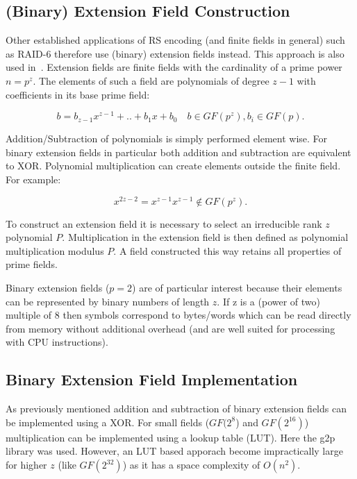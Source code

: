 \documentclass[
]{article}
\begin{document}
\newpage
\subsection{(Binary) Extension Field
Construction}\label{binary-extension-field-construction}

Other established applications of RS encoding (and finite fields in
general) such as RAID-6 therefore use (binary) extension fields instead. This approach is also used in~\cite{Ferrara2022}.
Extension fields are finite fields with the cardinality of a prime power
\(n = p^z\). The elements of such a field are polynomials of degree
\(z - 1\) with coefficients in its base prime field:

\begin{equation}
b = b_{z - 1} x^{z - 1} + .. + b_1 x + b_0 \quad b \in GF(p^z), b_i \in GF(p).
\end{equation}

Addition/Subtraction of polynomials is simply performed element wise.
For binary extension fields in particular both addition and subtraction
are equivalent to XOR. Polynomial multiplication can create
elements outside the finite field. For example:

\begin{equation}
x^{2z - 2} = x^{z - 1} x^{z - 1} \notin GF(p^z).
\end{equation}

To construct an extension field it is necessary to select an irreducible
rank \(z\) polynomial \(P\). Multiplication in
the extension field is then defined as polynomial multiplication modulus
\(P\). A field constructed this way retains all properties of prime
fields.

Binary extension fields (\(p = 2\)) are of particular interest because
their elements can be represented by binary numbers of length \(z\). If
z is a (power of two) multiple of 8 then symbols correspond to
bytes/words which can be read directly from memory without additional
overhead (and are well suited for processing with CPU instructions).

\subsection{Binary Extension Field
Implementation}\label{binary-extension-field-implementation}

As previously mentioned addition and subtraction of binary extension
fields can be implemented using a XOR. For small fields ($GF(2^{8}$) and
$GF(2^{16})$)  multiplication can be implemented using a lookup table (LUT). Here the
g2p~\cite{Wanzenbock} library was used. However, an LUT based apporach become impractically
large for higher \(z\) (like $GF(2^{32})$) as it has a space complexity of $O(n^2)$.
\end{document}

